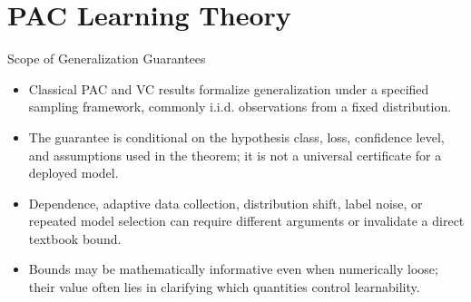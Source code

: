 \documentclass[aspectratio=169,11pt]{beamer}
\begin{document}
\section{PAC Learning Theory}

\begin{frame}{Scope of Generalization Guarantees}
  \begin{itemize}
    \item Classical PAC and VC results formalize generalization under a specified sampling framework, commonly i.i.d. observations from a fixed distribution.
    \item The guarantee is conditional on the hypothesis class, loss, confidence level, and assumptions used in the theorem; it is not a universal certificate for a deployed model.
    \item Dependence, adaptive data collection, distribution shift, label noise, or repeated model selection can require different arguments or invalidate a direct textbook bound.
    \item Bounds may be mathematically informative even when numerically loose; their value often lies in clarifying which quantities control learnability.
  \end{itemize}
\end{frame}
\end{document}
